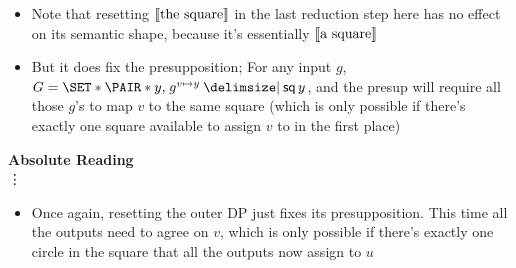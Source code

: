\documentclass[10pt,fleqn]{article}
\begin{document}
%
%
\begin{minipage}[t]{0.4\textwidth}
  \begin{itemize}
    \item
      Note that resetting $\llbracket \textrm{the square} \rrbracket$ in the last reduction
      step here has no effect on its semantic shape, because it's essentially
      $\llbracket \textrm{a square} \rrbracket$
    \item
      But it does fix the presupposition; For any input $g$, $G =
      \set{\pair{y}{g^{v\mapsto y}} \giv \cn{sq}\,y}$, and the presup will
      require all those $g$'s to map $v$ to the same square (which is only
      possible if there's exactly one square available to assign $v$ to in the
      first place)
  \end{itemize} 
  \textbf{Absolute Reading} \\ \vdots
  \vspace{12em}
  \begin{itemize}
    \item
      Once again, resetting the outer DP just fixes its presupposition. This
      time all the outputs need to agree on $v$, which is only possible if
      there's exactly one circle in the square that all the outputs now assign
      to $u$
  \end{itemize}
\end{minipage}

\newpage
\end{document}
